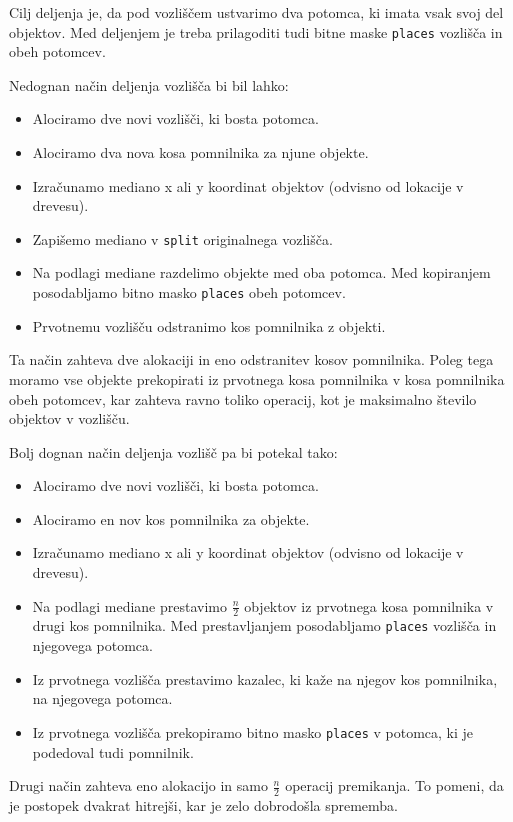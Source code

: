 \documentclass[a4paper,12pt]{article}
\begin{document}
Cilj deljenja je, da pod vozliščem ustvarimo dva potomca, ki imata vsak svoj del objektov. Med deljenjem
je treba prilagoditi tudi bitne maske \lstinline|places| vozlišča in obeh potomcev.

Nedognan način deljenja vozlišča bi bil lahko:
\begin{itemize}
    \item Alociramo dve novi vozlišči, ki bosta potomca.
    \item Alociramo dva nova kosa pomnilnika za njune objekte.
    \item Izračunamo mediano x ali y koordinat objektov (odvisno od lokacije v drevesu).
    \item Zapišemo mediano v \lstinline|split| originalnega vozlišča.
    \item Na podlagi mediane razdelimo objekte med oba potomca. Med kopiranjem
    posodabljamo bitno masko \lstinline|places| obeh potomcev.
    \item Prvotnemu vozlišču odstranimo kos pomnilnika z objekti.
\end{itemize}
Ta način zahteva dve alokaciji in eno odstranitev kosov pomnilnika. Poleg tega moramo
vse objekte prekopirati iz prvotnega kosa pomnilnika v kosa pomnilnika obeh potomcev,
kar zahteva ravno toliko operacij, kot je maksimalno število objektov v vozlišču.

Bolj dognan način deljenja vozlišč pa bi potekal tako:
\begin{itemize}
    \item Alociramo dve novi vozlišči, ki bosta potomca.
    \item Alociramo en nov kos pomnilnika za objekte.
    \item Izračunamo mediano x ali y koordinat objektov (odvisno od lokacije v drevesu).
    \item Na podlagi mediane prestavimo $ \frac{n}{2}$ objektov iz prvotnega kosa pomnilnika
    v drugi kos pomnilnika. Med prestavljanjem posodabljamo \lstinline|places| vozlišča in njegovega potomca.
    \item Iz prvotnega vozlišča prestavimo kazalec, ki kaže na njegov kos pomnilnika, na njegovega potomca.
    \item Iz prvotnega vozlišča prekopiramo bitno masko \lstinline|places| v potomca, ki je podedoval tudi pomnilnik.
\end{itemize}
Drugi način zahteva eno alokacijo in samo $\frac{n}{2}$ operacij premikanja. To pomeni, da je postopek
dvakrat hitrejši, kar je zelo dobrodošla sprememba.
\end{document}
